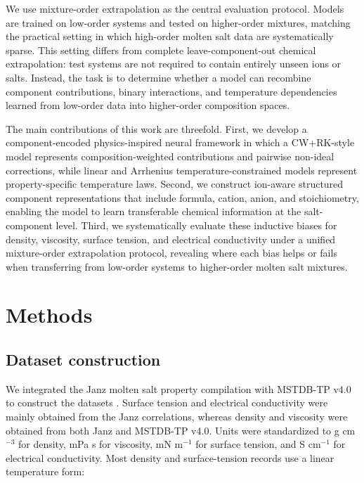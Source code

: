 \documentclass[journal=jctcce,manuscript=article,doi=true]{achemso}
\begin{document}
We use mixture-order extrapolation as the central evaluation protocol. Models are trained on low-order systems and tested on higher-order mixtures, matching the practical setting in which high-order molten salt data are systematically sparse. This setting differs from complete leave-component-out chemical extrapolation: test systems are not required to contain entirely unseen ions or salts. Instead, the task is to determine whether a model can recombine component contributions, binary interactions, and temperature dependencies learned from low-order data into higher-order composition spaces.

The main contributions of this work are threefold. First, we develop a component-encoded physics-inspired neural framework in which a CW+RK-style model represents composition-weighted contributions and pairwise non-ideal corrections, while linear and Arrhenius temperature-constrained models represent property-specific temperature laws. Second, we construct ion-aware structured component representations that include formula, cation, anion, and stoichiometry, enabling the model to learn transferable chemical information at the salt-component level. Third, we systematically evaluate these inductive biases for density, viscosity, surface tension, and electrical conductivity under a unified mixture-order extrapolation protocol, revealing where each bias helps or fails when transferring from low-order systems to higher-order molten salt mixtures.

\section{Methods}\label{sec:methods}

\subsection{Dataset construction}\label{sec:data}

We integrated the Janz molten salt property compilation with MSTDB-TP v4.0 to construct the datasets \cite{janz1988molten,chesser2025mstdb}. Surface tension and electrical conductivity were mainly obtained from the Janz correlations, whereas density and viscosity were obtained from both Janz and MSTDB-TP v4.0. Units were standardized to g cm\(^{-3}\) for density, mPa s for viscosity, mN m\(^{-1}\) for surface tension, and S cm\(^{-1}\) for electrical conductivity. Most density and surface-tension records use a linear temperature form:
\end{document}
